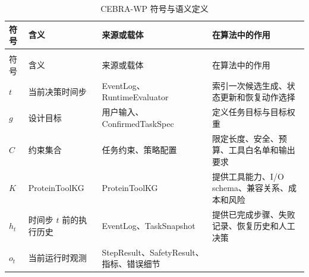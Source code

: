 {%
\begin{longtable}{@{}
  >{\centering\arraybackslash}p{}
  >{\centering\arraybackslash}p{}
  >{\centering\arraybackslash}p{}
  >{\centering\arraybackslash}p{}@{}}
\caption{CEBRA-WP 符号与语义定义}\label{tab:4-1-cebra-wp}\\
\toprule
\begin{minipage}[b]{\linewidth}\centering
符号
\end{minipage} & \begin{minipage}[b]{\linewidth}\centering
含义
\end{minipage} & \begin{minipage}[b]{\linewidth}\centering
来源或载体
\end{minipage} & \begin{minipage}[b]{\linewidth}\centering
在算法中的作用
\end{minipage} \\
\midrule
\endfirsthead
\multicolumn{4}{r}{表\thetable（续表）} \\
\toprule
\begin{minipage}[b]{\linewidth}\centering
符号
\end{minipage} & \begin{minipage}[b]{\linewidth}\centering
含义
\end{minipage} & \begin{minipage}[b]{\linewidth}\centering
来源或载体
\end{minipage} & \begin{minipage}[b]{\linewidth}\centering
在算法中的作用
\end{minipage} \\
\midrule
\endhead
\midrule
\endfoot
\bottomrule
\endlastfoot
$t$ & 当前决策时间步 & EventLog、RuntimeEvaluator &
索引一次候选生成、状态更新和恢复动作选择 \\
$g$ & 设计目标 & 用户输入、ConfirmedTaskSpec &
定义任务目标与目标权重 \\
$C$ & 约束集合 & 任务约束、策略配置 &
限定长度、安全、预算、工具白名单和输出要求 \\
$K$ & ProteinToolKG & ProteinToolKG & 提供工具能力、I/O
schema、兼容关系、成本和风险 \\
$h_t$ & 时间步 $t$ 前的执行历史 & EventLog、TaskSnapshot
& 提供已完成步骤、失败记录、恢复历史和人工决策 \\
$o_t$ & 当前运行时观测 &
StepResult、SafetyResult、指标、错误细节 &

\end{longtable}}

